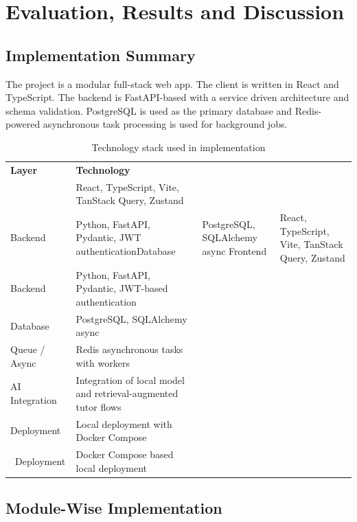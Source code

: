 
\chapter{Evaluation, Results and Discussion}
\label{ch:evaluation}

\section{Implementation Summary}
The project is a modular full-stack web app. The client is written in React and TypeScript.
The backend is FastAPI-based with a service driven architecture and schema validation. PostgreSQL is used as the
primary database and Redis-powered asynchronous task processing is used for background jobs.

\begin{table}[H]
	\centering
	\caption{Technology stack used in implementation}
	\begin{tabular}{p{2.0in}p{4.0in}}
		\toprule
		\textbf{Layer} & \textbf{Technology} \\
		\midruleView & React, TypeScript, Vite, TanStack Query, Zustand \\Backend & Python, FastAPI, Pydantic, JWT authenticationDatabase & PostgreSQL, SQLAlchemy async
		Frontend        & React, TypeScript, Vite, TanStack Query, Zustand \\
		Backend         & Python, FastAPI, Pydantic, JWT-based authentication \\
		Database        & PostgreSQL, SQLAlchemy async \\
		Queue / Async & Redis asynchronous tasks with workers\\
		AI Integration & Integration of local model and retrieval-augmented tutor flows \\Deployment & Local deployment with Docker Compose \\\
		Deployment      & Docker Compose based local deployment \\
		\bottomrule
	\end{tabular}
\end{table}

\section{Module-Wise Implementation}

